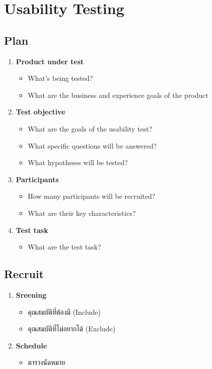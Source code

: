 \section{Usability Testing}
\subsection{Plan}
\begin{enumerate}
    \item \textbf{Product under test}
          \begin{itemize}
            \item What's being tested?
            \item What are the business and experience goals of the product
          \end{itemize}
    \item \textbf{Test objective}
          \begin{itemize}
              \item What are the goals of the usability test?
              \item What specific questions will be answered?
              \item What hypotheses will be tested?
          \end{itemize}
    \item \textbf{Participants}
          \begin{itemize}
              \item How many participants will be recruited?
              \item What are their key characteristics?
          \end{itemize}
    \item \textbf{Test task}
          \begin{itemize}
              \item What are the test task?
          \end{itemize}
\end{enumerate}
\subsection{Recruit}
\begin{enumerate}
    \item \textbf{Sreening}
          \begin{itemize}
            \item คุณสมบัติที่ต้องมี (Include)
            \item คุณสมบัติที่ไม่อยากได้ (Exclude)
          \end{itemize}
    \item \textbf{Schedule}
          \begin{itemize}
              \item ตารางนัดหมาย
          \end{itemize}
\end{enumerate}
